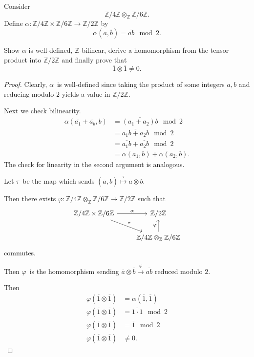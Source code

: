 \documentclass[11pt]{article}
\begin{document}
\begin{prob}
    Consider 
    \[
        \mathbb Z/4\mathbb Z \otimes_{\mathbb Z} 
        \mathbb Z/6\mathbb Z.
    \]
    Define $\alpha : \mathbb Z/4\mathbb Z \times 
    \mathbb Z/6\mathbb Z \to \mathbb Z/2\mathbb Z$ by 
    \[
        \alpha(\overline a, \overline b) 
        = \overline{ab} \mod 2. 
    \]
    
    Show $\alpha$ is well-defined, 
    $\mathbb Z$-bilinear, derive 
    a homomorphism from the tensor product into 
    $\mathbb Z/2\mathbb Z$ and finally prove that 
    \[
        \overline 1 \otimes \overline 1 \neq 0. 
    \]
\end{prob}
\begin{proof}
    Clearly, $\alpha$ is well-defined since 
    taking the product of some integers $a,b$ and reducing 
    modulo $2$ yields a value in $\mathbb Z/2\mathbb Z$. 

    Next we check bilinearity. 
    \begin{align*}
        \alpha(\overline{a_1} + \overline{a_b}, b) 
        &= \overline{(a_1 + a_2)b} \mod 2 \\ 
        &= \overline{a_1b + a_2b} \mod 2 \\ 
        &= \overline{a_1b} + \overline{a_2b} \mod 2 \\ 
        &= \alpha(a_1, b) + \alpha(a_2,b). 
    \end{align*}
    The check for linearity in the second argument is analogous. 

    Let $\tau$ be the map which sends $(\overline a, \overline b) 
    \overset\tau\mapsto \overline a \otimes \overline b$. 

    Then there exists $\varphi : \mathbb Z/4\mathbb Z 
    \otimes_{\mathbb Z} \mathbb Z/6\mathbb Z \to 
    \mathbb Z/2\mathbb Z$ such that 
    \[
        \begin{tikzcd}
            \mathbb Z/4\mathbb Z \times \mathbb Z/6\mathbb Z 
            \arrow[dr, "\tau"] \arrow[r, "\alpha"] 
            & \mathbb Z/2\mathbb Z \\ 
            & \mathbb Z/4\mathbb Z \otimes_{\mathbb Z} 
            \mathbb Z/6\mathbb Z \arrow[u,"\varphi"]
        \end{tikzcd}
    \]
    commutes. 

    Then $\varphi$ is the homomorphism sending 
    $\overline a \otimes \overline b \overset\varphi\mapsto 
    \overline{ab}$ reduced modulo $2$. 

    Then 
    \begin{align*}
        \varphi(\overline 1 \otimes \overline 1) 
        &= \alpha(\overline 1,\overline 1) \\ 
        \varphi(\overline 1 \otimes \overline 1) 
        &= \overline{1 \cdot 1} \mod 2 \\ 
        \varphi(\overline 1 \otimes \overline 1)
        &= \overline 1 \mod 2 \\  
        \varphi(\overline 1\otimes \overline 1)   
        &\neq 0.
    \end{align*}
\end{proof}
\end{document}
